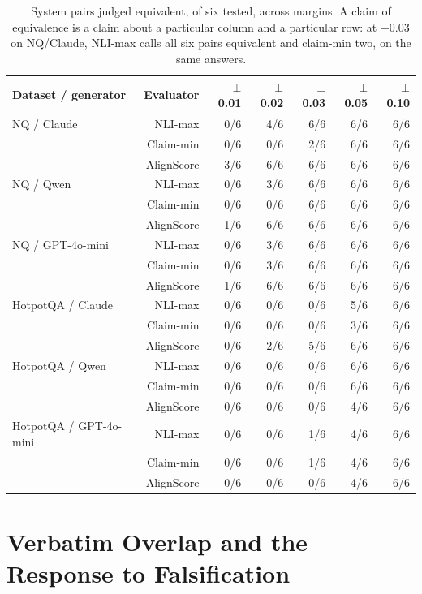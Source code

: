 \documentclass[11pt]{article}
\begin{document}
\begin{table}[t]
\centering
\small
\begin{tabular}{lrrrrrr}
\toprule
\textbf{Dataset / generator} & \textbf{Evaluator} & \textbf{$\pm$0.01} & \textbf{$\pm$0.02} & \textbf{$\pm$0.03} & \textbf{$\pm$0.05} & \textbf{$\pm$0.10} \\
\midrule
NQ / Claude & NLI-max & 0/6 & 4/6 & 6/6 & 6/6 & 6/6 \\
 & Claim-min & 0/6 & 0/6 & 2/6 & 6/6 & 6/6 \\
 & AlignScore & 3/6 & 6/6 & 6/6 & 6/6 & 6/6 \\
NQ / Qwen & NLI-max & 0/6 & 3/6 & 6/6 & 6/6 & 6/6 \\
 & Claim-min & 0/6 & 0/6 & 6/6 & 6/6 & 6/6 \\
 & AlignScore & 1/6 & 6/6 & 6/6 & 6/6 & 6/6 \\
NQ / GPT-4o-mini & NLI-max & 0/6 & 3/6 & 6/6 & 6/6 & 6/6 \\
 & Claim-min & 0/6 & 3/6 & 6/6 & 6/6 & 6/6 \\
 & AlignScore & 1/6 & 6/6 & 6/6 & 6/6 & 6/6 \\
\midrule
HotpotQA / Claude & NLI-max & 0/6 & 0/6 & 0/6 & 5/6 & 6/6 \\
 & Claim-min & 0/6 & 0/6 & 0/6 & 3/6 & 6/6 \\
 & AlignScore & 0/6 & 2/6 & 5/6 & 6/6 & 6/6 \\
HotpotQA / Qwen & NLI-max & 0/6 & 0/6 & 0/6 & 6/6 & 6/6 \\
 & Claim-min & 0/6 & 0/6 & 0/6 & 6/6 & 6/6 \\
 & AlignScore & 0/6 & 0/6 & 0/6 & 4/6 & 6/6 \\
HotpotQA / GPT-4o-mini & NLI-max & 0/6 & 0/6 & 1/6 & 4/6 & 6/6 \\
 & Claim-min & 0/6 & 0/6 & 1/6 & 4/6 & 6/6 \\
 & AlignScore & 0/6 & 0/6 & 0/6 & 4/6 & 6/6 \\
\bottomrule
\end{tabular}
\caption{System pairs judged equivalent, of six tested, across margins. A claim of equivalence is a claim about a particular column and a particular row: at $\pm$0.03 on NQ/Claude, NLI-max calls all six pairs equivalent and claim-min two, on the same answers.}
\label{tab:9}
\end{table}

\section{Verbatim Overlap and the Response to Falsification}
\label{app:copying}
\end{document}

